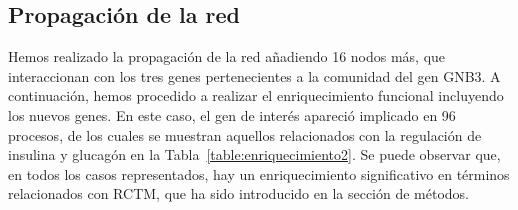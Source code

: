 \subsection{Propagación de la red}

Hemos realizado la propagación de la red añadiendo 16 nodos más, que interaccionan con los tres genes pertenecientes a la comunidad del gen GNB3. A continuación, hemos procedido a realizar el enriquecimiento funcional incluyendo los nuevos genes. En este caso, el gen de interés apareció implicado en 96 procesos, de los cuales se muestran aquellos relacionados con la regulación de insulina y glucagón en la Tabla~\ref{table:enriquecimiento2}. Se puede observar que, en todos los casos representados, hay un enriquecimiento significativo en términos relacionados con RCTM, que ha sido introducido en la sección de métodos.


